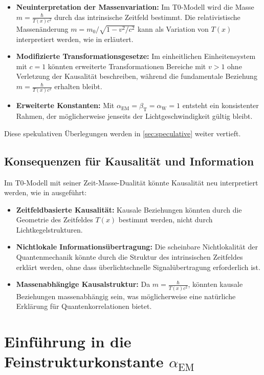\documentclass[12pt,a4paper]{article}
\newcommand{\Tfield}{T(x)}
\newcommand{\betaT}{\beta_{\text{T}}}
\newcommand{\alphaEM}{\alpha_{\text{EM}}}
\newcommand{\alphaW}{\alpha_{\text{W}}}
\begin{document}
	\begin{itemize}
		\item \textbf{Neuinterpretation der Massenvariation:} Im T0-Modell wird die Masse \(m = \frac{\hbar}{\Tfield c^2}\) durch das intrinsische Zeitfeld bestimmt. Die relativistische Massenänderung \(m = m_0/\sqrt{1-v^2/c^2}\) kann als Variation von \(\Tfield\) interpretiert werden, wie in \cite{pascher_zeit_2025} erläutert.
		\item \textbf{Modifizierte Transformationsgesetze:} Im einheitlichen Einheitensystem mit \(c = 1\) könnten erweiterte Transformationen Bereiche mit \(v > 1\) ohne Verletzung der Kausalität beschreiben, während die fundamentale Beziehung \(m = \frac{\hbar}{\Tfield c^2}\) erhalten bleibt.
		\item \textbf{Erweiterte Konstanten:} Mit \(\alphaEM = \betaT = \alphaW = 1\) entsteht ein konsistenter Rahmen, der möglicherweise jenseits der Lichtgeschwindigkeit gültig bleibt.
	\end{itemize}
	
	Diese spekulativen Überlegungen werden in \cref{sec:speculative} weiter vertieft.
	
	\subsection{Konsequenzen für Kausalität und Information}
	\label{subsec:causality}
	
	Im T0-Modell mit seiner Zeit-Masse-Dualität könnte Kausalität neu interpretiert werden, wie in \cite{pascher_feldtheorie_2025} ausgeführt:
	\begin{itemize}
		\item \textbf{Zeitfeldbasierte Kausalität:} Kausale Beziehungen könnten durch die Geometrie des Zeitfeldes \(\Tfield\) bestimmt werden, nicht durch Lichtkegelstrukturen.
		\item \textbf{Nichtlokale Informationsübertragung:} Die scheinbare Nichtlokalität der Quantenmechanik könnte durch die Struktur des intrinsischen Zeitfeldes erklärt werden, ohne dass überlichtschnelle Signalübertragung erforderlich ist.
		\item \textbf{Massenabhängige Kausalstruktur:} Da \(m = \frac{\hbar}{\Tfield c^2}\), könnten kausale Beziehungen massenabhängig sein, was möglicherweise eine natürliche Erklärung für Quantenkorrelationen bietet.
	\end{itemize}
	
	\section{Einführung in die Feinstrukturkonstante \(\alphaEM\)}
	\label{sec:alpha_em}
	
\end{document}
